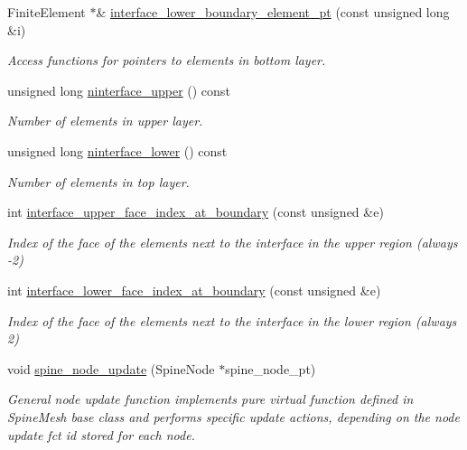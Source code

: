 \begin{DoxyCompactItemize}
Finite\+Element $\ast$\& \hyperlink{classoomph_1_1TwoLayerSpineMesh_a190b41082ad3d8c25c5d3d07040b8933}{interface\+\_\+lower\+\_\+boundary\+\_\+element\+\_\+pt} (const unsigned long \&i)
\begin{DoxyCompactList}\small\item\em Access functions for pointers to elements in bottom layer. \end{DoxyCompactList}\item 
unsigned long \hyperlink{classoomph_1_1TwoLayerSpineMesh_adb5035599cf78ba65e53f7183c98e115}{ninterface\+\_\+upper} () const
\begin{DoxyCompactList}\small\item\em Number of elements in upper layer. \end{DoxyCompactList}\item 
unsigned long \hyperlink{classoomph_1_1TwoLayerSpineMesh_a5ad10a9a2022a32e2a5f311f789fae51}{ninterface\+\_\+lower} () const
\begin{DoxyCompactList}\small\item\em Number of elements in top layer. \end{DoxyCompactList}\item 
int \hyperlink{classoomph_1_1TwoLayerSpineMesh_a2f31c7c1ad05803e296545a0a4210164}{interface\+\_\+upper\+\_\+face\+\_\+index\+\_\+at\+\_\+boundary} (const unsigned \&e)
\begin{DoxyCompactList}\small\item\em Index of the face of the elements next to the interface in the upper region (always -\/2) \end{DoxyCompactList}\item 
int \hyperlink{classoomph_1_1TwoLayerSpineMesh_a441e4c3a46f0ba2210130a59be471e09}{interface\+\_\+lower\+\_\+face\+\_\+index\+\_\+at\+\_\+boundary} (const unsigned \&e)
\begin{DoxyCompactList}\small\item\em Index of the face of the elements next to the interface in the lower region (always 2) \end{DoxyCompactList}\item 
void \hyperlink{classoomph_1_1TwoLayerSpineMesh_ad9b80ae7e34be72ca03f6d1bc6062de4}{spine\+\_\+node\+\_\+update} (Spine\+Node $\ast$spine\+\_\+node\+\_\+pt)
\begin{DoxyCompactList}\small\item\em General node update function implements pure virtual function defined in Spine\+Mesh base class and performs specific update actions, depending on the node update fct id stored for each node. \end{DoxyCompactList}\end{DoxyCompactItemize}
